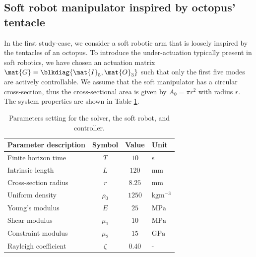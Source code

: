 \subsection{Soft robot manipulator inspired by octopus' tentacle}
In the first study-case, we consider a soft robotic arm that is loosely inspired by the tentacles of an octopus. To introduce the under-actuation typically present in soft robotics, we have chosen an actuation matrix $\mat{G} = \blkdiag{\mat{I}_5, \mat{O}_3}$ such that only the first five modes are actively controllable.  We assume that the soft manipulator has a circular cross-section, thus the cross-sectional area is given by $A_0 = \pi r^2$ with radius $r$. The system properties are shown in Table \ref{tab:C3:parameters1}.
%
\begin{table}[t]
  \vspace{-0.25cm}
  \caption{Parameters setting for the solver, the soft robot, and controller.}\label{tab:C3:parameters1} \centering
  \begin{tabular}{l|c|c|l}
    Parameter description & Symbol & Value & Unit \\
    \midrule
    Finite horizon time & $T $ & $10$ & s \\
    Intrinsic length & $L $ & $ 120$ & mm \\
    Cross-section radius & $r $ & $ 8.25$ & $\text{mm}$ \\
    Uniform density & $\rho_0 $ & $ 1250$ & $\text{kg}\text{m}^{-3}$ \\
    Young's modulus & $E $ & $ 25$ & $\text{MPa}$ \\
    Shear modulus & $\mu_1 $ & $ 10 $ & $\text{MPa}$ \\
    Constraint modulus & $\mu_2 $ & $ 15 $ & $\text{GPa}$ \\
    Rayleigh coefficient & $\zeta $ & $ 0.40 $ & - \\
    \bottomrule
  \end{tabular}
  \vspace{-3mm}
  \end{table}
%
